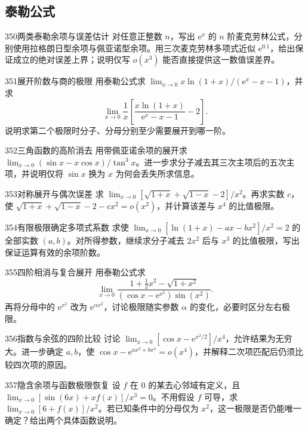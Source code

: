 \subsection{泰勒公式}
\begin{exercise}{350}{两类泰勒余项与误差估计}
对任意正整数 $n$，写出 $\mathrm e^x$ 的 $n$ 阶麦克劳林公式，分别使用拉格朗日型余项与佩亚诺型余项。用三次麦克劳林多项式近似 $\mathrm e^{0.1}$，给出保证成立的绝对误差上界；说明仅写 $o(x^3)$ 能否直接提供这一数值误差界。
\end{exercise}
\begin{exercise}{351}{展开阶数与商的极限}
用泰勒公式求 $\lim_{x\to0}x\ln(1+x)/(\mathrm e^x-x-1)$，并求
\[\lim_{x\to0}\frac1x\left[\frac{x\ln(1+x)}{\mathrm e^x-x-1}-2\right].\]
说明求第二个极限时分子、分母分别至少需要展开到哪一阶。
\end{exercise}
\begin{exercise}{352}{三角函数的高阶消去}
用带佩亚诺余项的展开求 $\lim_{x\to0}(\sin x-x\cos x)/\tan^3x$。进一步求分子减去其三次主项后的五次主项，并说明仅将 $\sin x$ 换为 $x$ 为何会丢失所求信息。
\end{exercise}
\begin{exercise}{353}{对称展开与偶次误差}
求 $\lim_{x\to0}[\sqrt{1+x}+\sqrt{1-x}-2]/x^2$。再求实数 $c$，使 $\sqrt{1+x}+\sqrt{1-x}-2-cx^2=o(x^2)$，并计算该差与 $x^4$ 的比值极限。
\end{exercise}
\begin{exercise}{354}{有限极限确定多项式系数}
求使 $\lim_{x\to0}[\ln(1+x)-ax-bx^2]/x^2=2$ 的全部实数 $(a,b)$。对所得参数，继续求分子减去 $2x^2$ 后与 $x^3$ 的比值极限，写出保证运算有效的余项阶数。
\end{exercise}
\begin{exercise}{355}{四阶相消与复合展开}
用泰勒公式求
\[\lim_{x\to0}\frac{1+\tfrac12x^2-\sqrt{1+x^2}}{(\cos x-\mathrm e^{x^2})\sin(x^2)}.\]
再将分母中的 $\mathrm e^{x^2}$ 改为 $\mathrm e^{\alpha x^2}$，讨论极限随实参数 $\alpha$ 的变化，必要时区分左右极限。
\end{exercise}
\begin{exercise}{356}{指数与余弦的四阶比较}
讨论 $\lim_{x\to0}[\cos x-\mathrm e^{x^2/2}]/x^4$，允许结果为无穷大。进一步确定 $a,b$，使 $\cos x-\mathrm e^{ax^2+bx^4}=o(x^4)$，并解释二次项匹配后仍须比较四次项的原因。
\end{exercise}
\begin{exercise}{357}{隐含余项与函数极限恢复}
设 $f$ 在 $0$ 的某去心邻域有定义，且 $\lim_{x\to0}[\sin(6x)+xf(x)]/x^3=0$。不用假设 $f$ 可导，求 $\lim_{x\to0}[6+f(x)]/x^2$。若已知条件中的分母仅为 $x^2$，这一极限是否仍能唯一确定？给出两个具体函数说明。
\end{exercise}
